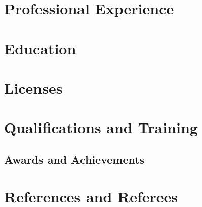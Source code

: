 \documentclass[10pt]{article}
\begin{document}
\section*{Professional Experience}


\section*{Education}


\section*{Licenses}


\section*{Qualifications and Training}


\subsection*{Awards and Achievements}


\section*{References and Referees}

\end{document}
